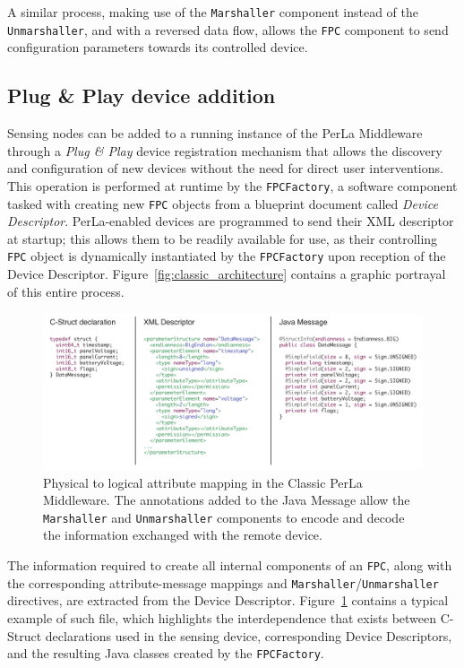 A similar process, making use of the \texttt{Marshaller} component instead of
the \texttt{Unmarshaller}, and with a reversed data flow, allows the
\texttt{FPC} component to send configuration parameters towards its controlled
device.

\subsection{Plug \& Play device addition}
\label{sec:classic_fpcfactory}

Sensing nodes can be added to a running instance of the PerLa Middleware
through a \textit{Plug \& Play} device registration mechanism that allows the
discovery and configuration of new devices without the need for direct user
interventions. This operation is performed at runtime by the
\texttt{FPCFactory}, a software component tasked with creating new \texttt{FPC}
objects from a blueprint document called \textit{Device Descriptor}.
PerLa-enabled devices are programmed to send their XML descriptor at startup;
this allows them to be readily available for use, as their controlling
\texttt{FPC} object is dynamically instantiated by the \texttt{FPCFactory} upon
reception of the Device Descriptor. Figure~\ref{fig:classic_architecture}
contains a graphic portrayal of this entire process.

\begin{figure}[h!]
\includegraphics[width=\textwidth]{imgs/classic_descriptor.pdf}
\caption{Physical to logical attribute mapping in the Classic PerLa Middleware.
The annotations added to the Java Message allow the \texttt{Marshaller} and
\texttt{Unmarshaller} components to encode and decode the information exchanged 
with the remote device.}
\label{fig:classic_descriptor}
\end{figure}

The information required to create all internal components of an \texttt{FPC},
along with the corresponding attribute-message mappings and
\texttt{Marshaller}/\texttt{Unmarshaller} directives, are extracted from the
Device Descriptor. Figure~\ref{fig:classic_descriptor} contains a typical
example of such file, which highlights the interdependence that exists between
C-Struct declarations used in the sensing device, corresponding Device
Descriptors, and the resulting Java classes created by the \texttt{FPCFactory}.

